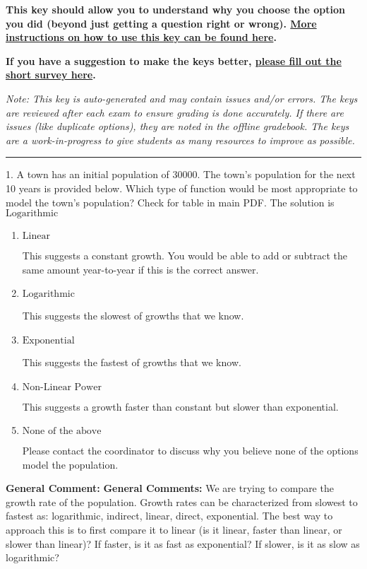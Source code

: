 \documentclass{extbook}[14pt]
\begin{document}
\textbf{This key should allow you to understand why you choose the option you did (beyond just getting a question right or wrong). \href{https://xronos.clas.ufl.edu/mac1105spring2020/courseDescriptionAndMisc/Exams/LearningFromResults}{More instructions on how to use this key can be found here}.}

\textbf{If you have a suggestion to make the keys better, \href{https://forms.gle/CZkbZmPbC9XALEE88}{please fill out the short survey here}.}

\textit{Note: This key is auto-generated and may contain issues and/or errors. The keys are reviewed after each exam to ensure grading is done accurately. If there are issues (like duplicate options), they are noted in the offline gradebook. The keys are a work-in-progress to give students as many resources to improve as possible.}

\rule{\textwidth}{0.4pt}

1. A town has an initial population of 30000. The town's population for the next 10 years is provided below. Which type of function would be most appropriate to model the town's population?
Check for table in main PDF. 
The solution is $ \text{Logarithmic} $ 

\begin{enumerate}[label=\Alph*.] 
\item $ \text{Linear} $ 

 This suggests a constant growth. You would be able to add or subtract the same amount year-to-year if this is the correct answer. 
\item $ \text{Logarithmic} $ 

 This suggests the slowest of growths that we know. 
\item $ \text{Exponential} $ 

 This suggests the fastest of growths that we know. 
\item $ \text{Non-Linear Power} $ 

 This suggests a growth faster than constant but slower than exponential. 
\item $ \text{None of the above} $ 

 Please contact the coordinator to discuss why you believe none of the options model the population. 
\end{enumerate} 
 
\textbf{General Comment:} \textbf{General Comments:} We are trying to compare the growth rate of the population. Growth rates can be characterized from slowest to fastest as: logarithmic, indirect, linear, direct, exponential. The best way to approach this is to first compare it to linear (is it linear, faster than linear, or slower than linear)? If faster, is it as fast as exponential? If slower, is it as slow as logarithmic? 
\end{document}
